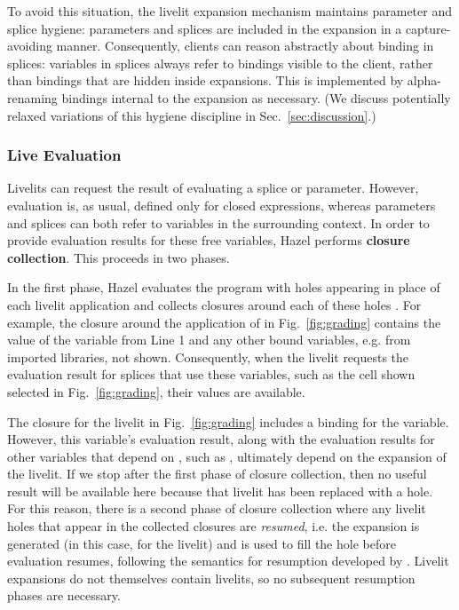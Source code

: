 To avoid this situation, the livelit expansion mechanism 
maintains parameter and splice hygiene: parameters and splices are included in the expansion 
in a capture-avoiding manner.
Consequently, clients can reason abstractly about binding in splices: variables in splices
always refer to bindings visible to the client, rather than bindings that are hidden inside expansions.
This is implemented by alpha-renaming bindings internal to the expansion as necessary.
(We discuss potentially relaxed variations of this hygiene discipline in Sec.~\ref{sec:discussion}.)

\subsubsection{Live Evaluation}\label{sec:live-evaluation}
Livelits can request the result of evaluating a splice or parameter.
However, evaluation is, as usual, defined only for closed expressions, 
whereas parameters and splices can both refer to variables in the surrounding
context. In order to provide evaluation results for these free variables, 
Hazel performs \textbf{closure collection}. This proceeds in two phases.

In the first phase, Hazel evaluates the program with holes appearing in place of each livelit 
application and collects closures around each of these holes \cite{HazelnutLive}. 
For example, the closure around the application of  in Fig.~\ref{fig:grading}
contains the value of the  variable from Line 1 and any other bound variables, e.g. 
from imported libraries, not shown. Consequently, when the livelit requests the evaluation result for
splices that use these variables, such as the cell shown selected in Fig.~\ref{fig:grading}, their values are available. 

The closure for the  livelit in Fig.~\ref{fig:grading} includes a binding for 
the  variable. However, this variable's evaluation result, along with the evaluation 
results for other variables that depend on , such as , ultimately depend on the 
expansion of the  livelit. If we stop after the first phase of closure collection,
then no useful result will be available here because that livelit has been replaced with a hole.
For this reason, there is a second phase of closure collection where any livelit holes that appear 
in the collected closures are \emph{resumed}, i.e. the expansion is generated 
(in this case, for the  livelit) and is used to fill 
the hole before evaluation resumes, following the semantics for resumption developed by \citet{HazelnutLive}.
Livelit expansions do not themselves contain livelits, so no subsequent resumption phases are necessary.



